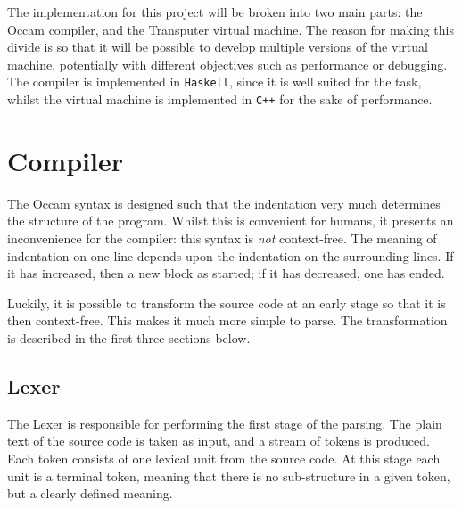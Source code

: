 The implementation for this project will be broken into two main parts: the
Occam compiler, and the Transputer virtual machine. The reason for making this
divide is so that it will be possible to develop multiple versions of the
virtual machine, potentially with different objectives such as performance or
debugging. The compiler is implemented in \texttt{Haskell}, since it is well
suited for the task, whilst the virtual machine is implemented in \texttt{C++}
for the sake of performance.

\section{Compiler}

The Occam syntax is designed such that the indentation very much determines the
structure of the program. Whilst this is convenient for humans, it presents an
inconvenience for the compiler: this syntax is \textit{not} context-free. The
meaning of indentation on one line depends upon the indentation on the
surrounding lines. If it has increased, then a new block as started; if it has
decreased, one has ended.

Luckily, it is possible to transform the source code at an early stage so that
it is then context-free. This makes it much more simple to parse. The
transformation is described in the first three sections below.

\subsection{Lexer}

The Lexer is responsible for performing the first stage of the parsing. The
plain text of the source code is taken as input, and a stream of tokens is
produced. Each token consists of one lexical unit from the source code. At this
stage each unit is a terminal token, meaning that there is no sub-structure in
a given token, but a clearly defined meaning.

